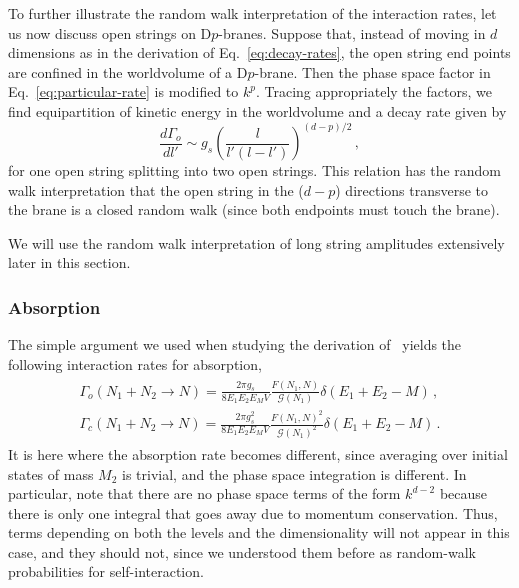 \documentclass[a4paper,11pt]{article}
\newcommand{\lr}[1]{\left(#1\right)}
\begin{document}
To further illustrate the random walk interpretation of the interaction rates, let us now discuss open strings on D$p$-branes.
Suppose that, instead of moving in $d$ dimensions as in the derivation of Eq.~\eqref{eq:decay-rates}, the open string end points 
are confined in the worldvolume of a D$p$-brane.
Then the phase space factor in 
Eq.~\eqref{eq:particular-rate} is modified to $k^p$.
Tracing appropriately the factors, we find equipartition of kinetic energy in the worldvolume and a decay rate given by
\begin{equation}
    \frac{d \Gamma_o}{dl'}\sim g_s \lr{\frac{l}{l'(l-l')}}^{(d-p)/2}\, ,
\end{equation}
for one open string splitting into two open strings.
This relation has the random walk interpretation that the open string in the ($d-p$) directions transverse to the brane is a closed random walk (since both endpoints must touch the brane).

We will use the random walk interpretation of long string amplitudes 
extensively later in this section.

\subsubsection*{Absorption}

The simple argument we used when studying the derivation of~\cite{Manes:2001cs} yields the following interaction rates for absorption,
\begin{gather}\label{eq:absorption}
\begin{split}
    \Gamma_{o}\lr{N_1+N_2 \rightarrow N}=\frac{2\pi g_s}{8E_1 E_2 E_{M} V}\frac{F(N_1,N)}{\mathcal{G}(N_1)}\delta (E_1+E_2-M) \, , \\
    \Gamma_{c}\lr{N_1 +N_2\rightarrow N}=\frac{2\pi g_s^2}{8E_1 E_2 E_{M}V}\frac{F(N_1,N)^2}{\mathcal{G}(N_1)^2}\delta (E_1+E_2-M) \, .
\end{split}
\end{gather}
It is here where the absorption rate becomes different, since averaging over initial states of mass $M_2$ is trivial, and the phase space integration is different.
In particular, note that there are no phase space terms of the form $k^{d-2}$ because there is only one integral that goes away due to momentum conservation. Thus, terms depending on both the levels and the dimensionality will not appear in this case, and they should not, since we understood them before as random-walk probabilities for self-interaction.
\\
\end{document}
